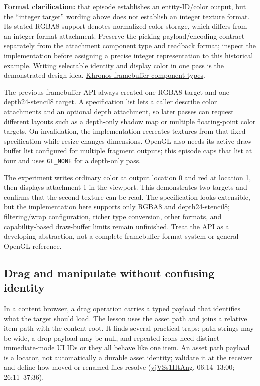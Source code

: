 \textbf{Format clarification:} that episode establishes an entity-ID/color output, but the ``integer target'' wording above does not establish an integer texture format. Its stated RGBA8 support denotes normalized color storage, which differs from an integer-format attachment. Preserve the picking payload/encoding contract separately from the attachment component type and readback format; inspect the implementation before assigning a precise integer representation to this historical example. Writing selectable identity and display color in one pass is the demonstrated design idea. \href{https://registry.khronos.org/OpenGL/specs/gl/glspec30.pdf}{Khronos framebuffer component types}.

The previous framebuffer API always created one RGBA8 target and one depth24-stencil8 target. A specification list lets a caller describe color attachments and an optional depth attachment, so later passes can request different layouts such as a depth-only shadow map or multiple floating-point color targets. On invalidation, the implementation recreates textures from that fixed specification while resize changes dimensions. OpenGL also needs its active draw-buffer list configured for multiple fragment outputs; this episode caps that list at four and uses \texttt{GL\_NONE} for a depth-only pass.

The experiment writes ordinary color at output location 0 and red at location 1, then displays attachment 1 in the viewport. This demonstrates two targets and confirms that the second texture can be read. The specification looks extensible, but the implementation here supports only RGBA8 and depth24-stencil8; filtering/wrap configuration, richer type conversion, other formats, and capability-based draw-buffer limits remain unfinished. Treat the API as a developing abstraction, not a complete framebuffer format system or general OpenGL reference.

\subsection{Drag and manipulate without confusing identity}\label{06-engine-ii-ch031-drag-and-manipulate-without-confusing-identity}

In a content browser, a drag operation carries a typed payload that identifies what the target should load. The lesson uses the asset path and joins a relative item path with the content root. It finds several practical traps: path strings may be wide, a drop payload may be null, and repeated icons need distinct immediate-mode UI IDs or they all behave like one item. An asset path payload is a locator, not automatically a durable asset identity; validate it at the receiver and define how moved or renamed files resolve (\href{https://www.youtube.com/watch?v=yjVSs1HtAng}{yjVSs1HtAng}, 06:14--13:00; 26:11--37:36).


